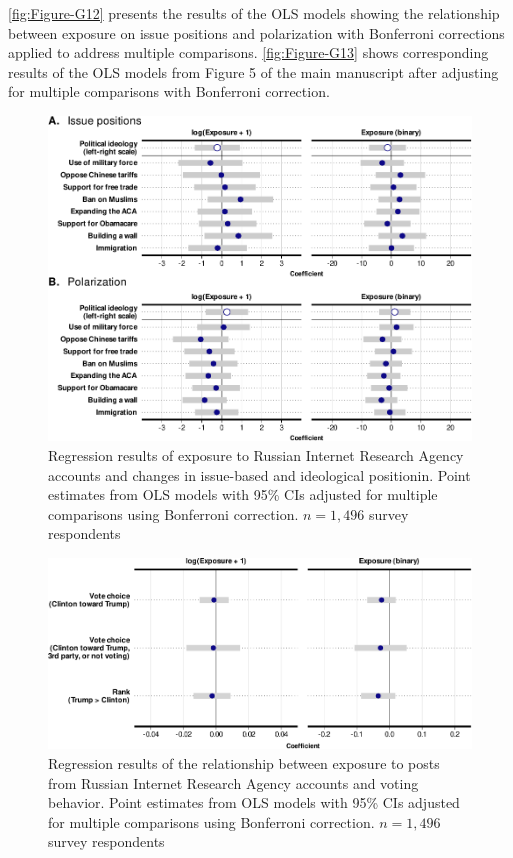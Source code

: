 \documentclass[
  12pt,
]{article}
\begin{document}
\autoref{fig:Figure-G12} presents the results of the OLS models showing the relationship between exposure on issue positions and polarization with Bonferroni corrections applied to address multiple comparisons. \autoref{fig:Figure-G13} shows corresponding results of the OLS models from Figure 5 of the main manuscript after adjusting for multiple comparisons with Bonferroni correction.

\begin{figure}
\centering
\includegraphics{Appendix_files/figure-latex/Figure-G12-1.pdf}
\caption{\label{fig:Figure-G12}Regression results of exposure to Russian Internet Research Agency accounts and changes in issue-based and ideological positionin. Point estimates from OLS models with 95\% CIs adjusted for multiple comparisons using Bonferroni correction. \(n = 1,496\) survey respondents}
\end{figure}

\begin{figure}
\centering
\includegraphics{Appendix_files/figure-latex/Figure-G13-1.pdf}
\caption{\label{fig:Figure-G13}Regression results of the relationship between exposure to posts from Russian Internet Research Agency accounts and voting behavior. Point estimates from OLS models with 95\% CIs adjusted for multiple comparisons using Bonferroni correction. \(n = 1,496\) survey respondents}
\end{figure}
\end{document}
